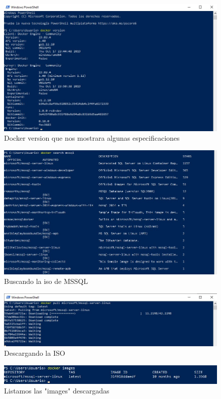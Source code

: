 \documentclass[preprint,12pt]{elsarticle}
\begin{document}
\begin{figure}[H]
	\begin{center}
		\includegraphics[width=12cm]{./IMAGENES/foto5} 
		\caption{Docker version que nos mostrara algunas especificaciones}
	\end{center}
\end{figure}


\begin{figure}[H]
	\begin{center}
		\includegraphics[width=12cm]{./IMAGENES/foto6} 
		\caption{Buscando la iso de MSSQL}
	\end{center}
\end{figure}

\begin{figure}[H]
	\begin{center}
		\includegraphics[width=12cm]{./IMAGENES/foto7} 
		\caption{Descargando la ISO}
	\end{center}
\end{figure}
\begin{figure}[H]
	\begin{center}
		\includegraphics[width=12cm]{./IMAGENES/foto9} 
		\caption{Listamos las "images" descargadas}
	\end{center}
\end{figure}
\end{document}
